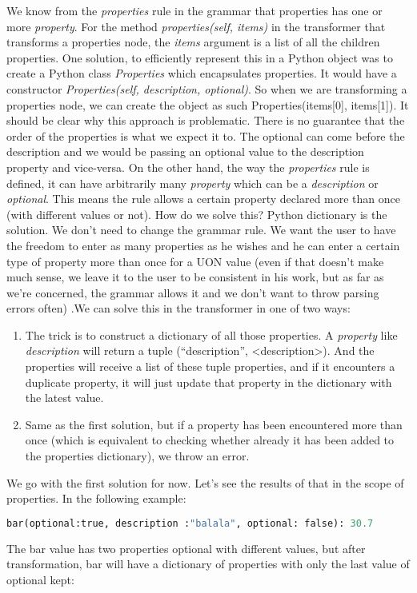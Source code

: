 \documentclass[12pt]{article}
\begin{document}
We know from the \emph{properties} rule in the grammar that properties has one or more \emph{property}. For the method \emph{properties(self, items)} in the transformer that transforms a properties node, the \emph{items} argument is a list of all the children properties. One solution, to efficiently represent this in a Python object was to create a Python class \emph{Properties} which encapsulates properties. It would have a constructor \emph{Properties(self, description, optional)}. So when we are transforming a properties node, we can create the object as such Properties(items[0], items[1]). It should be clear why this approach is problematic. There is no guarantee that the order of the properties is what we expect it to. The optional can come before the description and we would be passing an optional value to the description property and vice-versa. On the other hand, the way the \emph{properties} rule is defined, it can have arbitrarily many \emph{property} which can be a \emph{description} or \emph{optional}. This means the rule allows a certain property declared more than once (with different values or not).
How do we solve this? Python dictionary is the solution. We don’t need to change the grammar rule. We want the user to have the freedom to enter as many properties as he wishes and he can enter a certain type of property more than once for a UON value (even if that doesn't make much sense, we leave it to the user to be consistent in his work, but as far as we're concerned, the grammar allows it and we don't want to throw parsing errors often) .We can solve this in the transformer in one of two ways: 
\begin{enumerate}
    \item The trick is to construct a dictionary of all those properties. A \emph{property} like \emph{description} will return a tuple (“description”, <description>). And the properties will receive a list of these tuple properties, and if it encounters a duplicate property, it will just update that property in the dictionary with the latest value.
    \item Same as the first solution, but if a property has been encountered more than once (which is equivalent to checking whether already it has been added to the properties dictionary), we throw an error.
\end{enumerate}

We go with the first solution for now. Let's see the results of that in the scope of properties. In the following example:
\begin{lstlisting}[language=Python]
bar(optional:true, description :"balala", optional: false): 30.7
\end{lstlisting}
The bar value has two properties optional with different values, but after transformation, bar will have a dictionary of properties with only the last value of optional kept:
\end{document}
